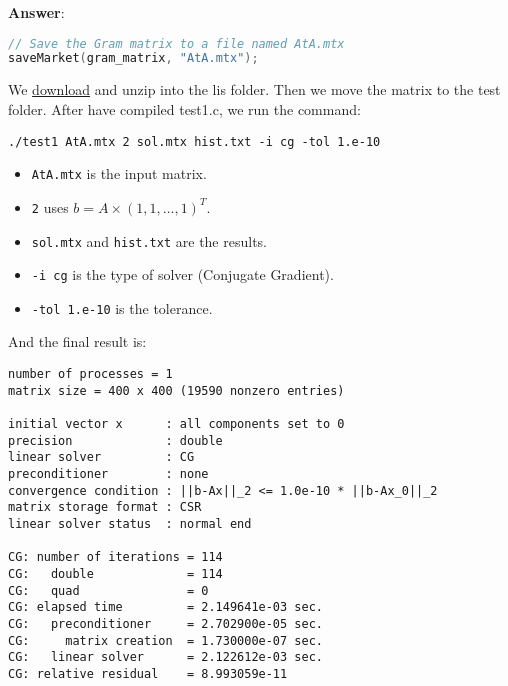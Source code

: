 \begin{enumerate}[label=\textcolor{Green3}{\textbf{\arabic*.}}]
    \textbf{Answer}:
    \begin{lstlisting}[language=C++]
// Save the Gram matrix to a file named AtA.mtx
saveMarket(gram_matrix, "AtA.mtx");\end{lstlisting}
    We \href{https://www.ssisc.org/lis/dl/lis-2.1.6.zip}{download} and unzip into the lis folder. Then we move the matrix to the test folder. After have compiled test1.c, we run the command:
    \begin{lstlisting}
./test1 AtA.mtx 2 sol.mtx hist.txt -i cg -tol 1.e-10\end{lstlisting}
    \begin{itemize}
        \item \texttt{AtA.mtx} is the input matrix.
        \item \texttt{2} uses $b = A \times \left(1, 1, \dots, 1\right)^{T}$.
        \item \texttt{sol.mtx} and \texttt{hist.txt} are the results.
        \item \texttt{-i cg} is the type of solver (Conjugate Gradient).
        \item \texttt{-tol 1.e-10} is the tolerance.
    \end{itemize}
    And the final result is:
    \begin{lstlisting}
number of processes = 1
matrix size = 400 x 400 (19590 nonzero entries)

initial vector x      : all components set to 0
precision             : double
linear solver         : CG
preconditioner        : none
convergence condition : ||b-Ax||_2 <= 1.0e-10 * ||b-Ax_0||_2
matrix storage format : CSR
linear solver status  : normal end

CG: number of iterations = 114
CG:   double             = 114
CG:   quad               = 0
CG: elapsed time         = 2.149641e-03 sec.
CG:   preconditioner     = 2.702900e-05 sec.
CG:     matrix creation  = 1.730000e-07 sec.
CG:   linear solver      = 2.122612e-03 sec.
CG: relative residual    = 8.993059e-11\end{lstlisting}
\end{enumerate}